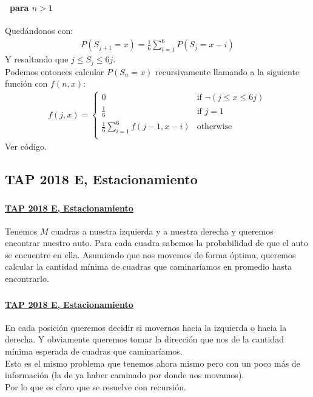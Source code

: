 \documentclass{beamer}
\begin{document}
\begin{frame}
  \frametitle{\SECTIONB}
  \framesubtitle{\EJA\ para \(n > 1\)}

  Quedándonos con:
  \begin{gather*}
    P(S_{j+1} = x) = \frac{1}{6}\sum_{i = 1}^{6}P(S_{j} = x - i)
  \end{gather*}
  Y resaltando que \(j \leq S_{j} \leq 6j\). \\
  Podemos entonces calcular \(P(S_{n} = x)\) recursivamente llamando a la siguiente función con \(f(n, x)\):
  \begin{gather*}
    f(j, x) = \begin{cases}
      0 & \text{if } \neg(j \leq x \leq 6j) \\
      \frac{1}{6} & \text{if } j = 1 \\
      \frac{1}{6}\sum_{i = 1}^{6}f(j-1, x-i) & \text{otherwise} \\
    \end{cases}
  \end{gather*} \pause
  Ver código.
\end{frame}

\subsection{TAP 2018 E, Estacionamiento}
\newcommand{\EJB}{\href{https://codeforces.com/group/YjFmW2O15Q/contest/101919}{TAP 2018 E, Estacionamiento}}

\begin{frame}
  \frametitle{\SECTIONB}
  \framesubtitle{\EJB}

  Tenemos \(M\) cuadras a nuestra izquierda y a nuestra derecha y queremos encontrar nuestro auto. Para cada cuadra sabemos la probabilidad de que el auto se encuentre en ella. Asumiendo que nos movemos de forma óptima, queremos calcular la cantidad mínima de cuadras que caminaríamos en promedio hasta encontrarlo.

\end{frame}

\begin{frame}
  \frametitle{\SECTIONB}
  \framesubtitle{\EJB}

  En cada posición queremos decidir si movernos hacia la izquierda o hacia la derecha. \pause Y obviamente queremos tomar la dirección que nos de la cantidad mínima esperada de cuadras que caminaríamos. \pause \\
  Esto es el mismo problema que tenemos ahora mismo pero con un poco más de información (la de ya haber caminado por donde nos movamos). \pause \\
  Por lo que es claro que se resuelve con recursión.
\end{frame}
\end{document}
